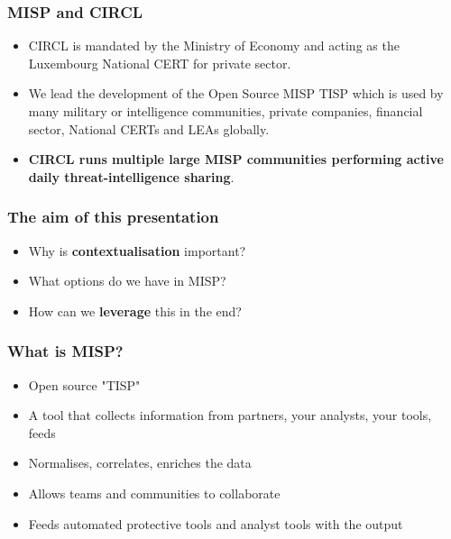 
\begin{frame}
\titlepage
\end{frame}

\begin{frame}
  \frametitle{MISP and CIRCL}
  \begin{itemize}
    \item CIRCL is mandated by the Ministry of Economy and acting as the Luxembourg National CERT for private sector.
    \item We lead the development of the Open Source MISP TISP which is used by many military or intelligence communities, private companies, financial sector, National CERTs and LEAs globally.
    \item {\bf CIRCL runs multiple large MISP communities performing active daily threat-intelligence sharing}.
  \end{itemize}
\end{frame}

\begin{frame}
  \frametitle{The aim of this presentation}
  \begin{itemize}
     \item Why is {\bf contextualisation} important?
     \item What options do we have in MISP?
     \item How can we {\bf leverage} this in the end?
  \end{itemize}
\end{frame}

\begin{frame}
\frametitle{What is MISP?}
\begin{itemize}
       \item Open source "TISP"
       \item A tool that collects information from partners, your analysts, your tools, feeds
       \item Normalises, correlates, enriches the data
       \item Allows teams and communities to collaborate
       \item Feeds automated protective tools and analyst tools with the output
\end{itemize}
\end{frame}


